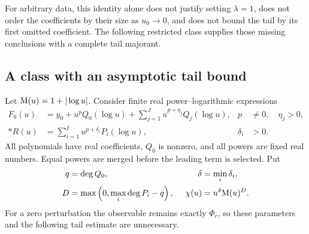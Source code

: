 For arbitrary data, this identity alone does not justify setting $\lambda=1$,
does not order the coefficients by their size as $u_0\to0$, and does not
bound the tail by its first omitted coefficient. The following restricted
class supplies those missing conclusions with a complete tail majorant.

\subsection{A class with an asymptotic tail bound}

Let $\mathrm M(u)=1+|\log u|$. Consider finite real power--logarithmic expressions
\begin{align}
 F_0(u)&=y_0+u^p Q_0(\log u)
       +\sum_{j=1}^{J}u^{p+\eta_j}Q_j(\log u),
       &p&\ne0,\quad \eta_j>0,\label{eq:core-admissible-core}\\*
 R(u)&=\sum_{i=1}^{I}u^{p+\delta_i}P_i(\log u),
       &\delta_i&>0.\label{eq:core-admissible-perturbation}
\end{align}
All polynomials have real coefficients, $Q_0$ is nonzero, and all powers
are fixed real numbers. Equal powers are merged before the leading term
is selected. Put
\begin{equation}
 \begin{aligned}
 q&=\deg Q_0, &\qquad \delta&=\min_i\delta_i,\\
 D&=\max\left(0,\max_i\deg P_i-q\right),
 &\chi(u)&=u^\delta\mathrm M(u)^D.
 \end{aligned}
 \label{eq:core-small-scale}
\end{equation}
For a zero perturbation the observable remains exactly $\Phi_r$, so these
parameters and the following tail estimate are unnecessary.

